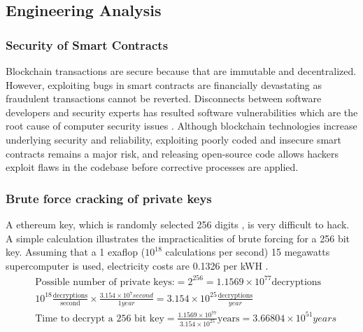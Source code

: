 \subsection{Engineering Analysis}
 \subsubsection{Security of Smart Contracts}
 
 Blockchain transactions are secure because that are immutable and decentralized. However, exploiting bugs in smart contracts are financially devastating \cite{funnyJoke:Online} as fraudulent transactions cannot be reverted. Disconnects between software developers and security experts has resulted software vulnerabilities which are the root cause of computer security issues \cite{Liu:2012:SVD:2475183.2476546}. Although blockchain technologies increase underlying security and reliability, exploiting poorly coded and insecure smart contracts remains a major risk, and releasing open-source code allows hackers exploit flaws in the codebase before corrective processes are applied.  



\subsubsection{Brute force cracking of private keys}
A ethereum key, which is randomly selected 256 digits \cite{ethereumWhitePaper:Online}, is very difficult to hack. A simple calculation illustrates the impracticalities of brute forcing for a 256 bit key. Assuming that a 1 exaflop ($10^{18}$ calculations per second) 15 megawatts supercomputer \cite{Service617} is used, electricity costs are 0.1326 per kWH \cite{BCHydroRates}. %
\vspace*{-0.1cm}
\begin{align}
& \text{Possible number of private keys:} = 2^{256} = 1.1569 \times 10^{77} \text{decryptions} \\
& 10^{18} \frac{\text{decryptions}}{\text{second}} \times \frac{3.154 \times 10^7 second}{1 year} = 3.154 \times 10^{25} \frac{\text{decryptions}}{year} \\
& \text{Time to decrypt a 256 bit key} = \frac{1.1569 \times 10^{77} }{3.154 \times 10^{25} } \text{years}= 3.66804 \times 10^{51} years
\end{align}

